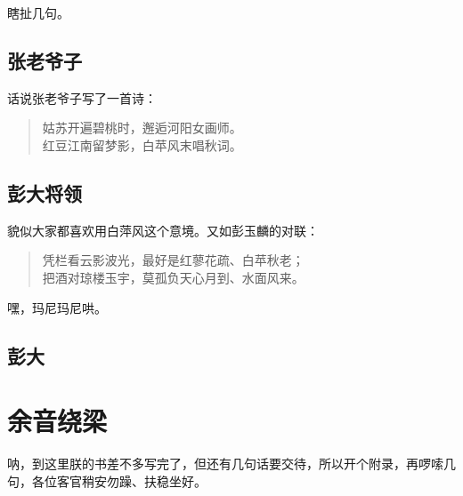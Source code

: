 \documentclass[]{ctexbook}
\begin{document}
瞎扯几句。

\hypertarget{ux5f20ux8001ux7237ux5b50}{%
\section{张老爷子}\label{ux5f20ux8001ux7237ux5b50}}

话说张老爷子写了一首诗：

\begin{quote}
姑苏开遍碧桃时，邂逅河阳女画师。\\
红豆江南留梦影，白苹风末唱秋词。
\end{quote}

\hypertarget{ux5f6dux5927ux5c06ux9886}{%
\section{彭大将领}\label{ux5f6dux5927ux5c06ux9886}}

貌似大家都喜欢用白萍风这个意境。又如彭玉麟的对联：

\begin{quote}
凭栏看云影波光，最好是红蓼花疏、白苹秋老；\\
把酒对琼楼玉宇，莫孤负天心月到、水面风来。
\end{quote}

嘿，玛尼玛尼哄。

\hypertarget{ux5f6dux5927}{%
\section{彭大}\label{ux5f6dux5927}}

\cleardoublepage

\hypertarget{appendix-ux9644ux5f55}{%
\appendix {}}


\hypertarget{sound}{%
\chapter{余音绕梁}\label{sound}}

呐，到这里朕的书差不多写完了，但还有几句话要交待，所以开个附录，再啰嗦几句，各位客官稍安勿躁、扶稳坐好。



\backmatter
\printindex
\end{document}
